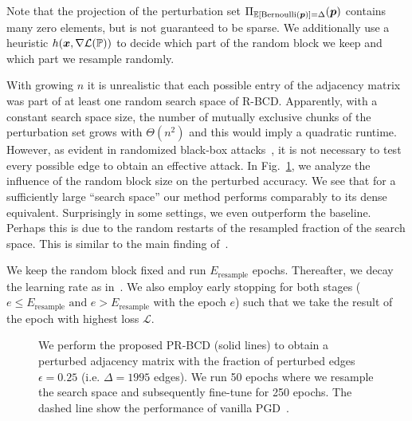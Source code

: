 \documentclass[letterpaper]{article} %
\begin{document}
Note that the projection of the perturbation set \(\Pi_{\mathbb{E}[\text{Bernoulli}({\bm{p}})] = \Delta} ({\bm{p}})\) contains many zero elements, but is not guaranteed to be sparse. We additionally use a heuristic \(h({\bm{x}}, \nabla \mathcal{L}({\mathbb{P}}))\) to decide which part of the random block we keep and which part we resample randomly.

With growing \(n\) it is unrealistic that each possible entry of the adjacency matrix was part of at least one random search space of R-BCD. Apparently, with a constant search space size, the number of mutually exclusive chunks of the perturbation set grows with \(\Theta(n^2)\) and this would imply a quadratic runtime. However, as evident in randomized black-box attacks~\citep{Waniek2018}, it is not necessary to test every possible edge to obtain an effective attack. In Fig.~\ref{fig:randomblocksizeinfluence}, we analyze the influence of the random block size on the perturbed accuracy. We see that for a sufficiently large ``search space'' our method performs comparably to its dense equivalent. Surprisingly in some settings, we even outperform the baseline. Perhaps this is due to the random restarts of the resampled fraction of the search space. This is similar to the main finding of~\citet{Wong2020}.

We keep the random block fixed and run \(E_{\text{resample}}\) epochs. Thereafter, we decay the learning rate as in~\cite{Xu2019a}. We also employ early stopping for both stages (\(e \le E_{\text{resample}} \text{ and } e > E_{\text{resample}}\) with the epoch \(e\)) such that we take the result of the epoch with highest loss \(\mathcal{L}\). 

\begin{figure}
  \centering
  \vspace{-15pt}
  \resizebox{\linewidth}{!}{}
  \resizebox{0.6\linewidth}{!}{
     
  }
  \caption{We perform the proposed PR-BCD (solid lines) to obtain a perturbed adjacency matrix with the fraction of perturbed edges \(\epsilon=0.25\) (i.e. \(\Delta=1995\) edges). We run 50 epochs where we resample the search space and subsequently fine-tune for 250 epochs. The dashed line show the performance of vanilla PGD~\citep{Xu2019a}.\label{fig:randomblocksizeinfluence}}
\end{figure}
 
\end{document}
